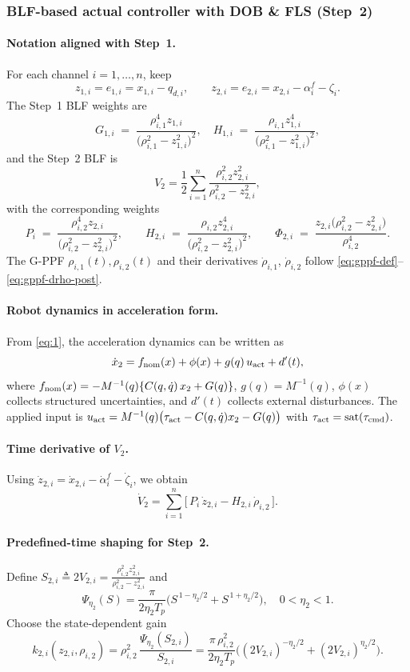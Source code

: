 \documentclass[pdflatex,sn-mathphys-num]{sn-jnl}%
\theoremstyle{thmstyleone}%
\theoremstyle{thmstyletwo}%
\theoremstyle{thmstylethree}%
\begin{document}
\subsubsection{BLF-based actual controller with DOB \& FLS (Step~2)}

\paragraph{Notation aligned with Step~1.}
For each channel $i=1,\dots,n$, keep
\[
z_{1,i}=e_{1,i}=x_{1,i}-q_{d,i},\qquad
z_{2,i}=e_{2,i}=x_{2,i}-\alpha_i^{f}-\zeta_i .
\]
The Step~1 BLF weights are
\[
G_{1,i}\;=\;\frac{\rho_{i,1}^4 z_{1,i}}{\bigl(\rho_{i,1}^{2}-z_{1,i}^{2}\bigr)^{2}},\quad
H_{1,i}\;=\;\frac{\rho_{i,1} z_{1,i}^{4}}{\bigl(\rho_{i,1}^{2}-z_{1,i}^{2}\bigr)^{2}},
\]
and the Step~2 BLF is
\[
V_2=\frac12\sum_{i=1}^{n}\frac{\rho_{i,2}^2 z_{2,i}^2}{\rho_{i,2}^2-z_{2,i}^2},
\]
with the corresponding weights
\[
P_i \;=\; \frac{\rho_{i,2}^4 z_{2,i}}{\bigl(\rho_{i,2}^{2}-z_{2,i}^{2}\bigr)^{2}},\qquad
H_{2,i}\;=\;\frac{\rho_{i,2} z_{2,i}^{4}}{\bigl(\rho_{i,2}^{2}-z_{2,i}^{2}\bigr)^{2}},\qquad
\Phi_{2,i}\;=\;\frac{z_{2,i}\bigl(\rho_{i,2}^{2}-z_{2,i}^{2}\bigr)}{\rho_{i,2}^{4}} .
\]
The G-PPF ${\rho}_{i,1}(t),{\rho}_{i,2}(t)$ and their derivatives $\dot\rho_{i,1}$, $\dot\rho_{i,2}$ follow \eqref{eq:gppf-def}–\eqref{eq:gppf-drho-post}.

\paragraph{Robot dynamics in acceleration form.}
From \eqref{eq:1}, the acceleration dynamics can be written as
\[
\dot x_2 = f_{\rm nom}(x)+\phi(x)+g(q)\,u_{\rm act}+d'(t),
\]
where $f_{\rm nom}(x)=-M^{-1}(q)\{C(q,\dot q)\,x_2+G(q)\}$,
$g(q)=M^{-1}(q)$, $\phi(x)$ collects structured uncertainties,
and $d'(t)$ collects external disturbances.
The applied input is $u_{\rm act}=M^{-1}(q)\bigl(\tau_{\rm act}-C(q,\dot q)x_2-G(q)\bigr)$ with $\tau_{\rm act}=\mathrm{sat}(\tau_{\rm cmd})$.

\paragraph{Time derivative of $V_2$.}
Using $\dot z_{2,i}=\dot x_{2,i}-\dot\alpha_i^{f}-\dot\zeta_i$, we obtain
\[
\dot V_2=\sum_{i=1}^n \Big[\,P_i\,\dot z_{2,i}-H_{2,i}\,\dot\rho_{i,2}\,\Big].
\]

\paragraph{Predefined-time shaping for Step~2.}
Define $S_{2,i}\triangleq 2V_{2,i}=\frac{\rho_{i,2}^2 z_{2,i}^2}{\rho_{i,2}^2-z_{2,i}^2}$ and
\[
\Psi_{\eta_2}(S)=\frac{\pi}{2\eta_2 T_p}\bigl(S^{\,1-\eta_2/2}+S^{\,1+\eta_2/2}\bigr),\quad 0<\eta_2<1.
\]
Choose the state-dependent gain
\begin{equation}\label{eq:k2-pts}
k_{2,i}(z_{2,i},\rho_{i,2})=\rho_{i,2}^{2}\,\frac{\Psi_{\eta_2}(S_{2,i})}{S_{2,i}}
=\frac{\pi\,\rho_{i,2}^2}{2\eta_2 T_p}\Big((2V_{2,i})^{-\eta_2/2}+(2V_{2,i})^{\eta_2/2}\Big).
\end{equation}
\end{document}
